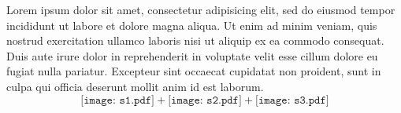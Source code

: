 Lorem ipsum dolor sit amet, consectetur adipisicing elit, sed do eiusmod
tempor incididunt ut labore et dolore magna aliqua. Ut enim ad minim veniam,
quis nostrud exercitation ullamco laboris nisi ut aliquip ex ea commodo
consequat. Duis aute irure dolor in reprehenderit in voluptate velit esse
cillum dolore eu fugiat nulla pariatur. Excepteur sint occaecat cupidatat non
proident, sunt in culpa qui officia deserunt mollit anim id est laborum.
\begin{equation*}
	\texttt{[image: s1.pdf]} + 
	\texttt{[image: s2.pdf]} + 
	\texttt{[image: s3.pdf]}
\end{equation*}
